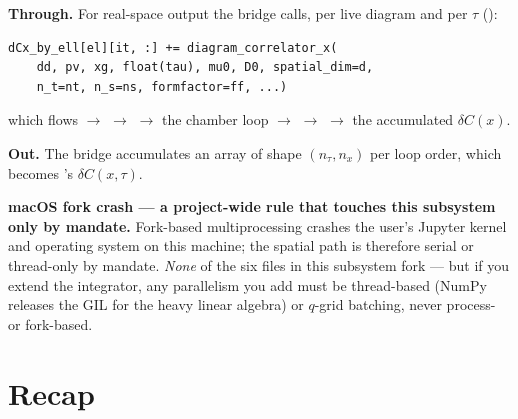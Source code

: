 \textbf{Through.} For real-space output the bridge calls, per live diagram and per
$\tau$ ():
\begin{lstlisting}
dCx_by_ell[el][it, :] += diagram_correlator_x(
    dd, pv, xg, float(tau), mu0, D0, spatial_dim=d,
    n_t=nt, n_s=ns, formfactor=ff, ...)
\end{lstlisting}
which flows  $\to$  $\to$
 $\to$ the chamber loop $\to$
 $\to$  $\to$ the
accumulated $\delta C(x)$.

\textbf{Out.} The bridge accumulates an array of shape $(n_\tau, n_x)$ per loop
order, which becomes 's $\delta C(x,\tau)$.

\begin{note}
\textbf{macOS fork crash --- a project-wide rule that touches this subsystem only
by mandate.} Fork-based multiprocessing crashes the user's Jupyter kernel and
operating system on this machine; the spatial path is therefore serial or
thread-only by mandate. \emph{None} of the six files in this subsystem fork --- but
if you extend the integrator, any parallelism you add must be thread-based (NumPy
releases the GIL for the heavy linear algebra) or $q$-grid batching, never
process- or fork-based.
\end{note}

\section{Recap}

